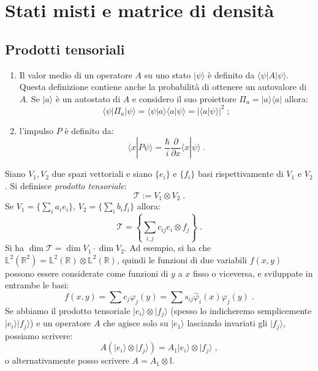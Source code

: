 \documentclass[10pt,a4paper]{report}
\theoremstyle{definition}
\numberwithin{equation}{section}
\newcommand{\bra}{\langle}
\newcommand{\ket}{\rangle}
\begin{document}
\chapter{Stati misti e matrice di densità}
\section{Prodotti tensoriali}
\begin{enumerate}
\item Il valor medio di un operatore $A$ su uno stato $|\psi\ket$ è definito da $\bra\psi|A|\psi\ket$. Questa definizione contiene anche la probabilità di ottenere un autovalore di $A$. Se $|a\ket$ è un autostato di $A$ e considero il suo proiettore $\Pi_a=|a\ket\bra a|$ allora:
\begin{equation}
\bra\psi|\Pi_a|\psi\ket=\bra\psi|a\ket\bra a|\psi\ket=|\bra a|\psi\ket|^2\;;
\end{equation}
\item l'impulso $P$ è definito da:
\begin{equation}
\bra x|P\psi\ket=\frac{\hbar}{i}\frac{\partial}{\partial x}\bra x|\psi\ket\;.
\end{equation}
\end{enumerate}
Siano $V_1,V_2$ due spazi vettoriali e siano $\{e_i\}$ e $\{f_i\}$ basi rispettivamente di $V_1$ e $V_2$. Si definisce \textit{prodotto tensoriale}:
\begin{equation}
\mathcal{T}:=V_1\otimes V_2\;.
\end{equation}
Se $V_1=\{\sum_i a_ie_i\}$, $V_2=\{\sum_i b_if_i\}$ allora:
\begin{equation}
\mathcal{T}=\left\{ \sum_{i,j} c_{ij}e_i\otimes f_j\right\}\;.
\end{equation}
Si ha $\dim\mathcal{T}=\dim V_1\cdot\dim V_2$. Ad esempio, si ha che $\mathbb{L}^2(\mathbb{R}^2)=\mathbb{L}^2(\mathbb{R})\otimes \mathbb{L}^2(\mathbb{R})$, quindi le funzioni di due variabili $f(x,y)$ possono essere considerate come funzioni di $y$ a $x$ fisso o viceversa, e sviluppate in entrambe le basi:
\begin{equation}
f(x,y)=\sum c_j\varphi_j(y)=\sum s_{ij}\stackrel{\sim}{\varphi}_i(x)\varphi_j(y)\;.
\end{equation}
Se abbiamo il prodotto tensoriale $|e_i\ket\otimes |f_j\ket$ (spesso lo indicheremo semplicemente $|e_i\ket|f_j\ket$) e un operatore $A$ che agisce solo su $|e_1\ket$ lasciando invariati gli $|f_j\ket$, possiamo scrivere:
\begin{equation}
A\left(|e_i\ket\otimes|f_j\ket\right)=A_1|e_i\ket\otimes|f_j\ket\;,
\end{equation}
o alternativamente posso scrivere $A=A_1\otimes\mathbb{I}$.
\end{document}
